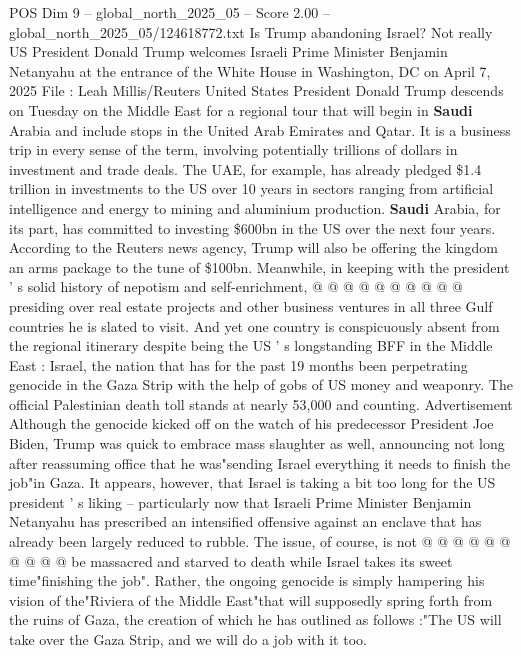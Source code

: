 \begin{textsample}{POS Dim 9 – global\_north\_2025\_05 – Score 2.00 – global\_north\_2025\_05/124618772.txt}  \label{ex:f9_pos_265}
Is Trump abandoning Israel?
Not really US President Donald Trump welcomes Israeli Prime Minister Benjamin Netanyahu at the entrance of the White House in Washington, DC on April 7, 2025 File : Leah Millis/Reuters United States President Donald Trump descends on Tuesday on the Middle East for a regional tour that will begin in \textbf{Saudi} Arabia and include stops in the United Arab Emirates and Qatar.
It is a business trip in every sense of the term, involving potentially trillions of dollars in investment and trade deals.
The UAE, for example, has already pledged \$1.4 trillion in investments to the US over 10 years in sectors ranging from artificial intelligence and energy to mining and aluminium production. \textbf{Saudi} Arabia, for its part, has committed to investing \$600bn in the US over the next four years.
According to the Reuters news agency, Trump will also be offering the kingdom an arms package to the tune of \$100bn.
Meanwhile, in keeping with the president ' s solid history of nepotism and self-enrichment, @ @ @ @ @ @ @ @ @ @ presiding over real estate projects and other business ventures in all three Gulf countries he is slated to visit.
And yet one country is conspicuously absent from the regional itinerary despite being the US ' s longstanding BFF in the Middle East : Israel, the nation that has for the past 19 months been perpetrating genocide in the Gaza Strip with the help of gobs of US money and weaponry.
The official Palestinian death toll stands at nearly 53,000 and counting.
Advertisement Although the genocide kicked off on the watch of his predecessor President Joe Biden, Trump was quick to embrace mass slaughter as well, announcing not long after reassuming office that he was"sending Israel everything it needs to finish the job"in Gaza.
It appears, however, that Israel is taking a bit too long for the US president ' s liking -- particularly now that Israeli Prime Minister Benjamin Netanyahu has prescribed an intensified offensive against an enclave that has already been largely reduced to rubble.
The issue, of course, is not @ @ @ @ @ @ @ @ @ @ be massacred and starved to death while Israel takes its sweet time"finishing the job".
Rather, the ongoing genocide is simply hampering his vision of the"Riviera of the Middle East"that will supposedly spring forth from the ruins of Gaza, the creation of which he has outlined as follows :"The US will take over the Gaza Strip, and we will do a job with it too.

\end{textsample}

